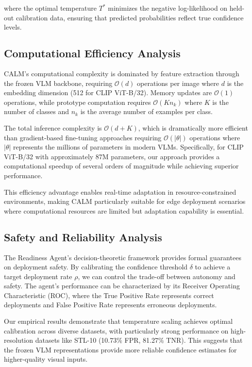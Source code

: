 \documentclass[conference]{IEEEtran}
\begin{document}
where the optimal temperature $T^*$ minimizes the negative log-likelihood on held-out calibration data, ensuring that predicted probabilities reflect true confidence levels.

\subsection{Computational Efficiency Analysis}

CALM's computational complexity is dominated by feature extraction through the frozen VLM backbone, requiring $\mathcal{O}(d)$ operations per image where $d$ is the embedding dimension (512 for CLIP ViT-B/32). Memory updates are $\mathcal{O}(1)$ operations, while prototype computation requires $\mathcal{O}(Kn_k)$ where $K$ is the number of classes and $n_k$ is the average number of examples per class.

The total inference complexity is $\mathcal{O}(d + K)$, which is dramatically more efficient than gradient-based fine-tuning approaches requiring $\mathcal{O}(|\theta|)$ operations where $|\theta|$ represents the millions of parameters in modern VLMs. Specifically, for CLIP ViT-B/32 with approximately 87M parameters, our approach provides a computational speedup of several orders of magnitude while achieving superior performance.

This efficiency advantage enables real-time adaptation in resource-constrained environments, making CALM particularly suitable for edge deployment scenarios where computational resources are limited but adaptation capability is essential.

\subsection{Safety and Reliability Analysis}

The Readiness Agent's decision-theoretic framework provides formal guarantees on deployment safety. By calibrating the confidence threshold $\delta$ to achieve a target deployment rate $\rho$, we can control the trade-off between autonomy and safety. The agent's performance can be characterized by its Receiver Operating Characteristic (ROC), where the True Positive Rate represents correct deployments and False Positive Rate represents erroneous deployments.

Our empirical results demonstrate that temperature scaling achieves optimal calibration across diverse datasets, with particularly strong performance on high-resolution datasets like STL-10 (10.73\% FPR, 81.27\% TNR). This suggests that the frozen VLM representations provide more reliable confidence estimates for higher-quality visual inputs.
\end{document}
